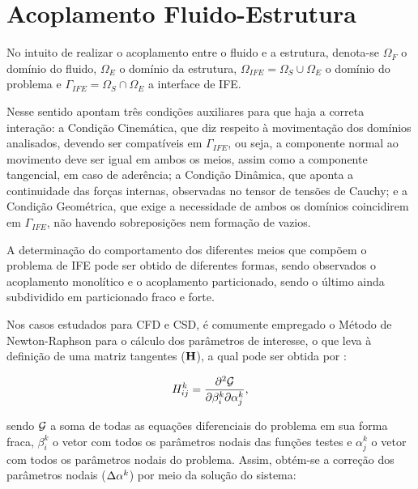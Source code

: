 \section{Acoplamento Fluido-Estrutura} \label{AFE}

No intuito de realizar o acoplamento entre o fluido e a estrutura, denota-se $\Omega_F$ o domínio do fluido, $\Omega_E$ o domínio da estrutura, $\Omega_{IFE}=\Omega_S\cup\Omega_E$ o domínio do problema e $\Gamma_{IFE}=\Omega_S\cap\Omega_E$ a interface de IFE.

Nesse sentido  apontam três condições auxiliares para que haja a correta interação: a Condição Cinemática, que diz respeito à movimentação dos domínios analisados, devendo ser compatíveis em $\Gamma_{IFE}$, ou seja, a componente normal ao movimento deve ser igual em ambos os meios, assim como a componente tangencial, em caso de aderência; a Condição Dinâmica, que aponta a continuidade das forças internas, observadas no tensor de tensões de Cauchy; e a Condição Geométrica, que exige a necessidade de ambos os domínios coincidirem em $\Gamma_{IFE}$, não havendo sobreposições nem formação de vazios.

A determinação do comportamento dos diferentes meios que compõem o problema de IFE pode ser obtido de diferentes formas, sendo observados o acoplamento monolítico e o acoplamento particionado, sendo o último ainda subdividido em particionado fraco e forte.

Nos casos estudados para CFD e CSD, é comumente empregado o Método de Newton-Raphson para o cálculo dos parâmetros de interesse, o que leva à definição de uma matriz tangentes ($\mathbf{H}$), a qual pode ser obtida por \cite{bazilevs2013computational,sanches2022metodos}:

\begin{equation}
    H_{ij}^k=\frac{\partial^2{\mathcal{G}}}{\partial{\beta_i^k}\partial{\alpha_j^k}}\text{,}
\end{equation}

\noindent sendo $\mathcal{G}$ a soma de todas as equações diferenciais do problema em sua forma fraca, $\beta_i^k$ o vetor com todos os parâmetros nodais das funções testes e $\alpha_j^k$ o vetor com todos os parâmetros nodais do problema. Assim, obtém-se a correção dos parâmetros nodais ($\Delta\mathbf{\alpha}^k$) por meio da solução do sistema:

